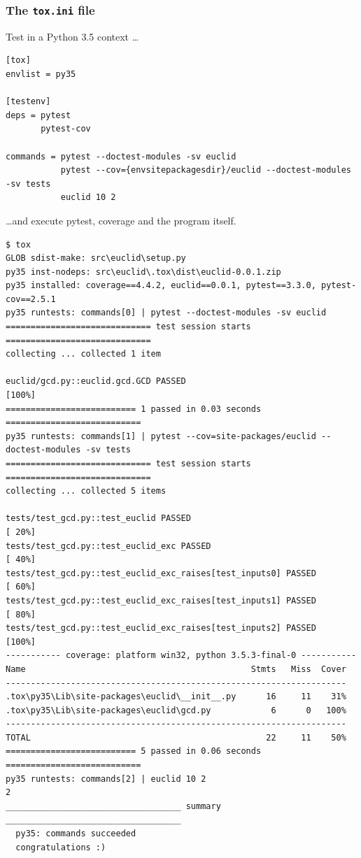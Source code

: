 \documentclass{beamer} %
\begin{document}
\begin{frame}[fragile]

\frametitle{The \texttt{tox.ini} file}

Test in a Python 3.5 context \ldots 
\begin{scriptsize}
\begin{verbatim}
[tox]
envlist = py35

[testenv]
deps = pytest
       pytest-cov

commands = pytest --doctest-modules -sv euclid
           pytest --cov={envsitepackagesdir}/euclid --doctest-modules -sv tests
           euclid 10 2
\end{verbatim}
\end{scriptsize}
\ldots and execute pytest, coverage and the program itself.

\end{frame}


\begin{frame}[fragile]
\begin{tiny}
\begin{verbatim}
$ tox
GLOB sdist-make: src\euclid\setup.py
py35 inst-nodeps: src\euclid\.tox\dist\euclid-0.0.1.zip
py35 installed: coverage==4.4.2, euclid==0.0.1, pytest==3.3.0, pytest-cov==2.5.1
py35 runtests: commands[0] | pytest --doctest-modules -sv euclid
============================= test session starts =============================
collecting ... collected 1 item

euclid/gcd.py::euclid.gcd.GCD PASSED                                     [100%]
========================== 1 passed in 0.03 seconds ===========================
py35 runtests: commands[1] | pytest --cov=site-packages/euclid --doctest-modules -sv tests
============================= test session starts =============================
collecting ... collected 5 items

tests/test_gcd.py::test_euclid PASSED                                    [ 20%]
tests/test_gcd.py::test_euclid_exc PASSED                                [ 40%]
tests/test_gcd.py::test_euclid_exc_raises[test_inputs0] PASSED           [ 60%]
tests/test_gcd.py::test_euclid_exc_raises[test_inputs1] PASSED           [ 80%]
tests/test_gcd.py::test_euclid_exc_raises[test_inputs2] PASSED           [100%]
----------- coverage: platform win32, python 3.5.3-final-0 -----------
Name                                             Stmts   Miss  Cover
--------------------------------------------------------------------
.tox\py35\Lib\site-packages\euclid\__init__.py      16     11    31%
.tox\py35\Lib\site-packages\euclid\gcd.py            6      0   100%
--------------------------------------------------------------------
TOTAL                                               22     11    50%
========================== 5 passed in 0.06 seconds ===========================
py35 runtests: commands[2] | euclid 10 2
2
___________________________________ summary ___________________________________
  py35: commands succeeded
  congratulations :)
\end{verbatim}
\end{tiny}

\end{frame}
\end{document}
